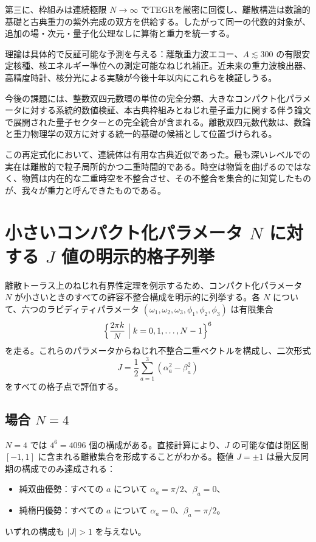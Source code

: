 \documentclass[a4paper]{article}
\theoremstyle{definition}
\begin{document}
第三に、枠組みは連続極限 $N \to \infty$ でTEGRを厳密に回復し、離散構造は数論的基礎と古典重力の紫外完成の双方を供給する。したがって同一の代数的対象が、追加の場・次元・量子化公理なしに算術と重力を統一する。

理論は具体的で反証可能な予測を与える：離散重力波エコー、$A \lesssim 300$ の有限安定核種、核エネルギー準位への測定可能なねじれ補正。近未来の重力波検出器、高精度時計、核分光による実験が今後十年以内にこれらを検証しうる。

今後の課題には、整数双四元数環の単位の完全分類、大きなコンパクト化パラメータに対する系統的数値検証、本古典枠組みとねじれ量子重力に関する伴う論文で展開された量子セクターとの完全統合が含まれる。離散双四元数代数は、数論と重力物理学の双方に対する統一的基礎の候補として位置づけられる。

この再定式化において、連続体は有用な古典近似であった。最も深いレベルでの実在は離散的で粒子局所的かつ二重時間的である。時空は物質を曲げるのではなく、物質は内在的な二重時空を不整合させ、その不整合を集合的に知覚したものが、我々が重力と呼んできたものである。

\appendix

\section{小さいコンパクト化パラメータ \texorpdfstring{$N$}{N} に対する \texorpdfstring{$J$}{J} 値の明示的格子列挙}

離散トーラス上のねじれ有界性定理を例示するため、コンパクト化パラメータ $N$ が小さいときのすべての許容不整合構成を明示的に列挙する。各 $N$ について、六つのラピディティパラメータ $(\omega_1,\omega_2,\omega_3,\phi_1,\phi_2,\phi_3)$ は有限集合
\[
\Bigl\{ \frac{2\pi k}{N} \Bigm| k = 0,1,\dots,N-1 \Bigr\}^6
\]
を走る。これらのパラメータからねじれ不整合二重ベクトルを構成し、二次形式
\[
J = \frac12 \sum_{a=1}^3 (\alpha_a^2 - \beta_a^2)
\]
をすべての格子点で評価する。

\subsection{場合 \texorpdfstring{$N = 4$}{N = 4}}

$N = 4$ では $4^6 = 4096$ 個の構成がある。直接計算により、$J$ の可能な値は閉区間 $[-1,1]$ に含まれる離散集合を形成することがわかる。極値 $J = \pm 1$ は最大反同期の構成でのみ達成される：
\begin{itemize}
  \item 純双曲優勢：すべての $a$ について $\alpha_a = \pi/2$、$\beta_a = 0$、
  \item 純楕円優勢：すべての $a$ について $\alpha_a = 0$、$\beta_a = \pi/2$。
\end{itemize}
いずれの構成も $|J| > 1$ を与えない。
\end{document}
